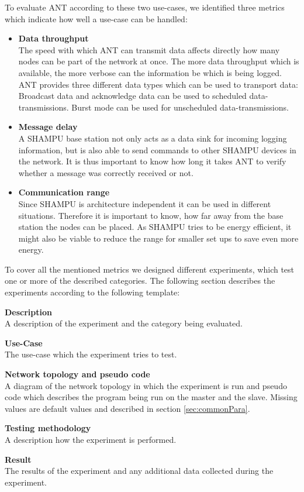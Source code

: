 To evaluate ANT according to these two use-cases, we identified three metrics which indicate how well a use-case can be handled:
	\begin{itemize}
		\item {\textbf{Data throughput }} \hfill \\ The speed with which ANT can transmit data affects directly how many nodes can be part of the network at once. The more data throughput which is available, the more verbose can the information be which is being logged. ANT provides three different data types which can be used to transport data: Broadcast data and acknowledge data can be used to scheduled data-transmissions. Burst mode can be used for unscheduled data-transmissions. 		
		
		\item {\textbf{Message delay}} \hfill \\ A SHAMPU base station not only acts as a data sink for incoming logging information, but is also able to send commands to other SHAMPU devices in the network.
		It is thus important to know how long it takes ANT to verify whether a message was correctly received or not.
		
		\item {\textbf{Communication range}} \hfill \\ Since SHAMPU is architecture independent it can be used in different situations. Therefore it is important to know, how far away from the base station the nodes can be placed. As SHAMPU tries to be energy efficient, it might also be viable to reduce the range for smaller set ups to save even more energy.
	\end{itemize}

To cover all the mentioned metrics we designed different experiments, which test one or more of the described categories. The following section describes the experiments according to the following template:

\begin{description}
	\item{\textbf{Description}} \hfill \\ A description of the experiment and the category being evaluated.
	\item{\textbf{Use-Case}} \hfill \\ The use-case which the experiment tries to test.
	\item{\textbf{Network topology and pseudo code}} \hfill \\ A diagram of the network topology in which the experiment is run and pseudo code which describes the program being run on the master and the slave. Missing values are default values and described in section \ref{sec:commonPara}.
	\item{\textbf{Testing methodology}} \hfill \\ A description how the experiment is performed.
	\item{\textbf{Result}} \hfill \\ The results of the experiment and any additional data collected during the experiment.
\end{description}


